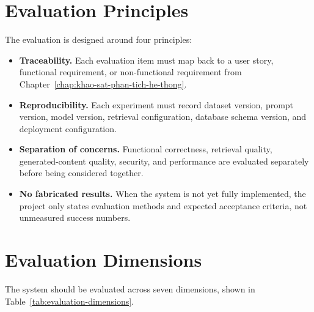 \section{Evaluation Principles}

The evaluation is designed around four principles:

\begin{itemize}
    \item \textbf{Traceability.} Each evaluation item must map back to a user
          story, functional requirement, or non-functional requirement from
          Chapter~\ref{chap:khao-sat-phan-tich-he-thong}.
    \item \textbf{Reproducibility.} Each experiment must record dataset
          version, prompt version, model version, retrieval configuration,
          database schema version, and deployment configuration.
    \item \textbf{Separation of concerns.} Functional correctness, retrieval
          quality, generated-content quality, security, and performance are
          evaluated separately before being considered together.
    \item \textbf{No fabricated results.} When the system is not yet fully
          implemented, the project only states evaluation methods and expected
          acceptance criteria, not unmeasured success numbers.
\end{itemize}

\section{Evaluation Dimensions}

The system should be evaluated across seven dimensions, shown in
Table~\ref{tab:evaluation-dimensions}.

